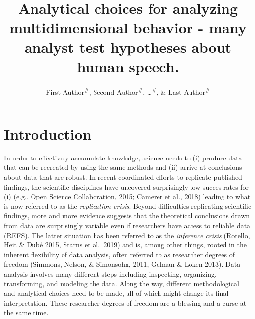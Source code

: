 \documentclass[
  english,
  man]{apa6}
\title{Analytical choices for analyzing multidimensional behavior - many analyst test hypotheses about human speech.}
\author{First Author\textsuperscript{\#}, Second Author\textsuperscript{\#}, \ldots{}\textsuperscript{\#}, \& Last Author\textsuperscript{\#}}
\date{}
\affiliation{\vspace{0.5cm}\textsuperscript{1} \#\\\textsuperscript{\ldots{}} \ldots{}}
\begin{document}
\maketitle

\hypertarget{introduction}{%
\section{Introduction}\label{introduction}}

In order to effectively accumulate knowledge, science needs to (i) produce data that can be recreated by using the same methods and (ii) arrive at conclusions about data that are robust.
In recent coordinated efforts to replicate published findings, the scientific disciplines have uncovered surprisingly low succes rates for (i) (e.g., Open Science Collaboration, 2015; Camerer et al., 2018) leading to what is now referred to as the \emph{replication crisis}.
Beyond difficulties replicating scientific findings, more and more evidence suggests that the theoretical conclusions drawn from data are surprisingly variable even if researchers have access to reliable data (REFS).
The latter situation has been referred to as the \emph{inference crisis} (Rotello, Heit \& Dubé 2015, Starns et al.~2019) and is, among other things, rooted in the inherent flexibility of data analysis, often referred to as researcher degrees of freedom (Simmons, Nelson, \& Simonsohn, 2011, Gelman \& Loken 2013).
Data analysis involves many different steps including inspecting, organizing, transforming, and modeling the data.
Along the way, different methodological and analytical choices need to be made, all of which might change its final interpretation.
These researcher degrees of freedom are a blessing and a curse at the same time.
\end{document}
